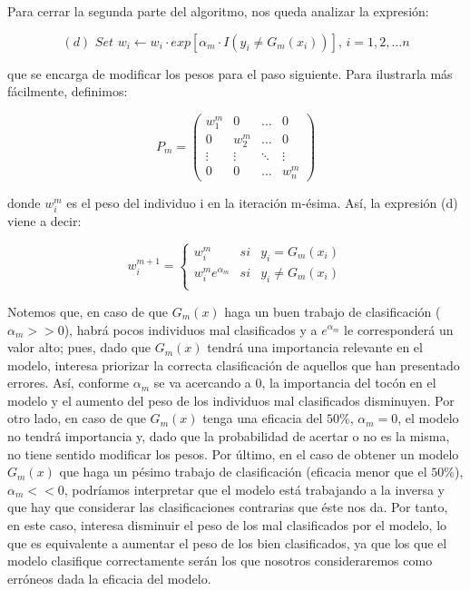 \documentclass[12pt,twoside]{article}
\begin{document}
Para cerrar la segunda parte del algoritmo, nos queda analizar la expresión:

\begin{equation*}
(d) \, \, Set \, \, w_i \longleftarrow w_i \cdot exp[\alpha_m \cdot I(y_i \neq G_m(x_i))], \, i = 1, 2, \dots n 
\end{equation*}

\noindent
que se encarga de modificar los pesos para el paso siguiente. Para ilustrarla más fácilmente, definimos:

\begin{equation*}
P_m = 
\begin{pmatrix}
w_1^m & 0 & \dots & 0 \\
0 & w_2^m & \dots & 0 \\
\vdots & \vdots & \ddots & \vdots \\
0 & 0 & \dots & w_n^m
\end{pmatrix}
\end{equation*}

\noindent
donde $w_i^m$ es el peso del individuo i en la iteración m-ésima. Así, la expresión (d) viene a decir:

\begin{equation*}
w_i^{m+1} =
\left\{
\begin{array}{crl}
w_i^m & si & y_i = G_m(x_i) \\
w_i^m e^{\alpha_m} & si & y_i \neq G_m(x_i) \\
\end{array}
\right.
\end{equation*}

Notemos que, en caso de que $G_m(x)$ haga un buen trabajo de clasificación ($\alpha_m >> 0$), habrá pocos individuos mal clasificados y a $e^{\alpha_m}$ le corresponderá un valor alto; pues, dado que $G_m(x)$ tendrá una importancia relevante en el modelo, interesa priorizar la correcta clasificación de aquellos que han presentado errores. Así, conforme $\alpha_m$ se va acercando a 0, la importancia del tocón en el modelo y el aumento del peso de los individuos mal clasificados disminuyen. Por otro lado, en caso de que $G_m(x)$ tenga una eficacia del $50\%$, $\alpha_m = 0$, el modelo no tendrá importancia y, dado que la probabilidad de acertar o no es la misma, no tiene sentido modificar los pesos. Por último, en el caso de obtener un modelo $G_m(x)$ que haga un pésimo trabajo de clasificación (eficacia menor que el $50\%$), $\alpha_m << 0$, podríamos interpretar que el modelo está trabajando a la inversa y que hay que considerar las clasificaciones contrarias que éste nos da. Por tanto, en este caso, interesa disminuir el peso de los mal clasificados por el modelo, lo que es equivalente a aumentar el peso de los bien clasificados, ya que los que el modelo clasifique correctamente serán los que nosotros consideraremos como erróneos dada la eficacia del modelo.
\end{document}
